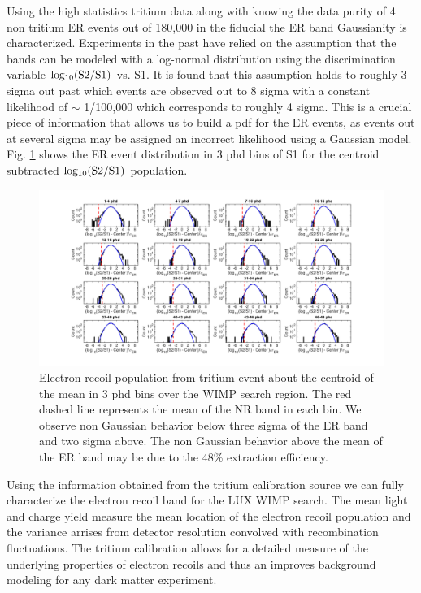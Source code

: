
Using the high statistics tritium data along with knowing the data purity of 4 non tritium ER events out of 180,000 in the fiducial the ER band Gaussianity is characterized. Experiments in the past have relied on the assumption that the bands can be modeled with a log-normal distribution using the discrimination variable $\rm log_{10}(S2/S1)$ vs. S1. It is found that this assumption holds to roughly 3 sigma out past which events are observed out to 8 sigma with a constant likelihood of $\sim$ 1/100,000 which corresponds to  roughly 4 sigma. This is a crucial piece of information that allows us to build a pdf for the ER events, as events out at several sigma may be assigned an incorrect likelihood using a Gaussian model. Fig. \ref{fig:ER-Gauss} shows the ER event distribution in 3 phd bins of S1 for the centroid subtracted $\rm log_{10}(S2/S1)$ population.


\onecolumngrid
\break
\begin{figure}\centering
\includegraphics[width=220mm]{fig/Gaussianity/GaussER_all.png}
\caption{Electron recoil population from tritium event about the centroid of the mean in 3 phd bins over the WIMP search region. The red dashed line represents the mean of the NR band in each bin. We observe non Gaussian behavior below three sigma of the ER band and two sigma above. The non Gaussian behavior above the mean of the ER band may be due to the 48\% extraction efficiency.  }
\label{fig:ER-Gauss}
\end{figure}
\twocolumngrid

Using the information obtained from the tritium calibration source we can fully characterize the electron recoil band for the LUX WIMP search. The mean light and charge yield measure the mean location of the electron recoil population and the variance arrises from detector resolution convolved with recombination fluctuations. The tritium calibration allows for a detailed measure of the underlying properties of electron recoils and thus an improves background modeling for any dark matter experiment.

